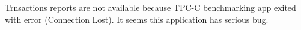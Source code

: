 \documentclass[../../main.tex]{subfiles}
\begin{document}
    Trnsactions reports are not available because TPC-C benchmarking app exited with error (Connection Lost). It seems this application has serious bug.
\end{document}

